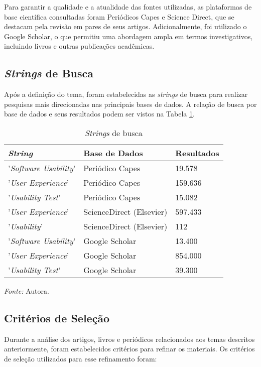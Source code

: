 Para garantir a qualidade e a atualidade das fontes utilizadas, as plataformas de base científica consultadas foram Periódicos Capes e Science Direct, que se destacam pela revisão em pares de seus artigos. Adicionalmente, foi utilizado o Google Scholar, o que permitiu uma abordagem ampla em termos investigativos, incluindo livros e outras publicações acadêmicas. 

\subsection{\textit{Strings} de Busca}
\label{sec:Strings de Busca}
Após a definição do tema, foram estabelecidas as \textit{strings} de busca para realizar pesquisas mais direcionadas nas principais bases de dados. A relação de busca por base de dados e seus resultados podem ser vistos na Tabela \ref{tab04}.

\begin{table}[h]
	\caption{\textit{Strings} de busca}
	\centering
	\label{tab04}
	\begin{tabular}{l|l|l}
	\hline
	\textit{String}               & Base de Dados            & Resultados \\ \hline
	'\textit{Software Usability}' & Periódico Capes          & 19.578     \\ \hline
	'\textit{User Experience}'    & Periódico Capes          & 159.636    \\ \hline
	'\textit{Usability Test}'     & Periódico Capes          & 15.082     \\ \hline
	'\textit{User Experience}'    & ScienceDirect (Elsevier) & 597.433    \\ \hline
	'\textit{Usability}'          & ScienceDirect (Elsevier) & 112        \\ \hline
	'\textit{Software Usability}' & Google Scholar           & 13.400     \\ \hline
	'\textit{User Experience}'    & Google Scholar           & 854.000    \\ \hline
	'\textit{Usability Test}'     & Google Scholar           & 39.300     \\ \hline
	\end{tabular}
	\begin{tablenotes}[flushleft]
		\centering
		\item \textit{Fonte:} Autora.
	\end{tablenotes}
\end{table}

\subsection{Critérios de Seleção}
\label{sec:Critérios de Selecao}
Durante a análise dos artigos, livros e periódicos relacionados aos temas descritos anteriormente, foram estabelecidos critérios para refinar os materiais. Os critérios de seleção utilizados para esse refinamento foram:

